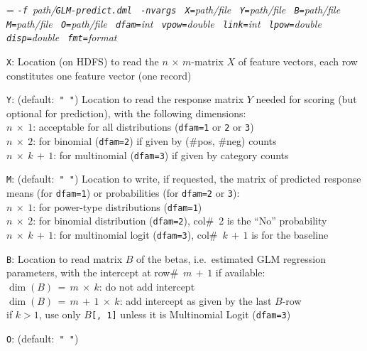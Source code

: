 \smallskip
{}
\smallskip

{\hangindent=\parindent\noindent\it%
{\tt{}-f }path/\/{\tt{}GLM-predict.dml}
{\tt{} -nvargs}
{\tt{} X=}path/file
{\tt{} Y=}path/file
{\tt{} B=}path/file
{\tt{} M=}path/file
{\tt{} O=}path/file
{\tt{} dfam=}int
{\tt{} vpow=}double
{\tt{} link=}int
{\tt{} lpow=}double
{\tt{} disp=}double
{\tt{} fmt=}format

}

\smallskip
{}
\begin{Description}
\item[{\tt X}:]
Location (on HDFS) to read the $n\,{\times}\,m$-matrix $X$ of feature vectors, each row
constitutes one feature vector (one record)
\item[{\tt Y}:] (default:\mbox{ }{\tt " "})
Location to read the response matrix $Y$ needed for scoring (but optional for prediction),
with the following dimensions: \\
    $n \:{\times}\: 1$: acceptable for all distributions ({\tt dfam=1} or {\tt 2} or {\tt 3}) \\
    $n \:{\times}\: 2$: for binomial ({\tt dfam=2}) if given by (\#pos, \#neg) counts \\
    $n \:{\times}\: k\,{+}\,1$: for multinomial ({\tt dfam=3}) if given by category counts
\item[{\tt M}:] (default:\mbox{ }{\tt " "})
Location to write, if requested, the matrix of predicted response means (for {\tt dfam=1}) or
probabilities (for {\tt dfam=2} or {\tt 3}):\\
    $n \:{\times}\: 1$: for power-type distributions ({\tt dfam=1}) \\
    $n \:{\times}\: 2$: for binomial distribution ({\tt dfam=2}), col\#~2 is the ``No'' probability \\
    $n \:{\times}\: k\,{+}\,1$: for multinomial logit ({\tt dfam=3}), col\#~$k\,{+}\,1$ is for the baseline
\item[{\tt B}:]
Location to read matrix $B$ of the \mbox{betas}, i.e.\ estimated GLM regression parameters,
with the intercept at row\#~$m\,{+}\,1$ if available:\\
    $\dim(B) \,=\, m \:{\times}\: k$: do not add intercept \\
    $\dim(B) \,=\, m\,{+}\,1 \:{\times}\: k$: add intercept as given by the last $B$-row \\
    if $k > 1$, use only $B${\tt [, 1]} unless it is Multinomial Logit ({\tt dfam=3})
\item[{\tt O}:] (default:\mbox{ }{\tt " "})

\end{Description}
